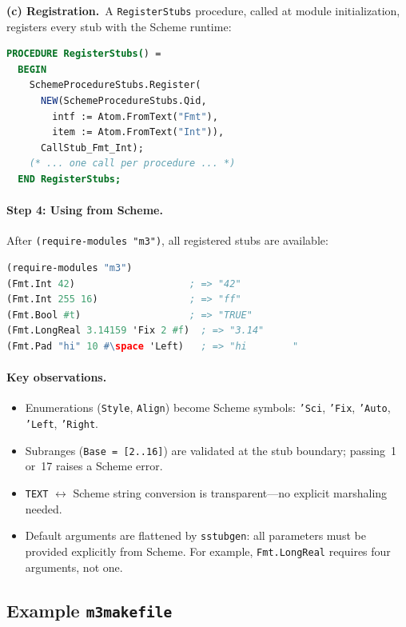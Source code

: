 \documentclass[12pt]{report}
\begin{document}
\medskip\noindent\textbf{(c) Registration.}\  A {\tt RegisterStubs}
procedure, called at module initialization, registers every stub
with the Scheme runtime:

\begin{lstlisting}[language=Modula3]
PROCEDURE RegisterStubs() =
  BEGIN
    SchemeProcedureStubs.Register(
      NEW(SchemeProcedureStubs.Qid,
        intf := Atom.FromText("Fmt"),
        item := Atom.FromText("Int")),
      CallStub_Fmt_Int);
    (* ... one call per procedure ... *)
  END RegisterStubs;
\end{lstlisting}

\paragraph{Step 4: Using from Scheme.}
After {\tt (require-modules "m3")}, all registered stubs are
available:

\begin{lstlisting}[language=Scheme]
(require-modules "m3")
(Fmt.Int 42)                    ; => "42"
(Fmt.Int 255 16)                ; => "ff"
(Fmt.Bool #t)                   ; => "TRUE"
(Fmt.LongReal 3.14159 'Fix 2 #f)  ; => "3.14"
(Fmt.Pad "hi" 10 #\space 'Left)   ; => "hi        "
\end{lstlisting}

\paragraph{Key observations.}
\begin{itemize}
\item Enumerations ({\tt Style}, {\tt Align}) become Scheme symbols:
  {\tt 'Sci}, {\tt 'Fix}, {\tt 'Auto}, {\tt 'Left}, {\tt 'Right}.
\item Subranges ({\tt Base = [2..16]}) are validated at the stub
  boundary; passing~1 or~17 raises a Scheme error.
\item {\tt TEXT} $\leftrightarrow$ Scheme string conversion is
  transparent---no explicit marshaling needed.
\item Default arguments are flattened by {\tt sstubgen}: all
  parameters must be provided explicitly from Scheme.
  For example, {\tt Fmt.LongReal} requires four arguments, not one.
\end{itemize}


\subsection{Example {\tt m3makefile}}
\end{document}
